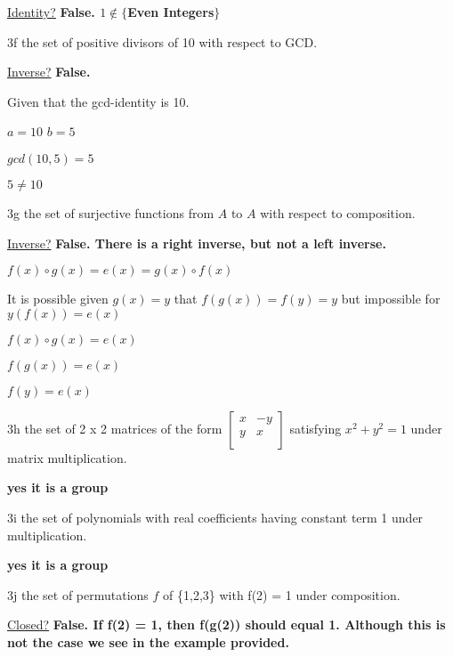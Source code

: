 \underline{Identity?} \textbf{False. $1 \notin \{$Even Integers$\}$}

\begin{question}{3f}
the set of positive divisors of 10 with respect to GCD.
\end{question}

\underline{Inverse?} \textbf{False.}

Given that the gcd-identity is 10.

$a=10$ $b=5$

$gcd(10,5) = 5$ 

$5 \neq 10$

\begin{question}{3g}
the set of surjective functions from $A$ to $A$ with respect to composition.
\end{question}

\underline{Inverse?} \textbf{False. There is a right inverse, but not a left inverse.}

$f(x) \circ g(x) = e(x) = g(x) \circ f(x)$

It is possible given $g(x) = y$ that $f(g(x)) = f(y) = y$ but impossible for $y(f(x)) = e(x)$

$f(x) \circ g(x) = e(x)$

$f(g(x)) = e(x)$

$f(y) = e(x)$

\begin{question}{3h}
the set of 2 x 2 matrices of the form $\begin{bmatrix}
  x & -y \\
  y & x  \\
 \end{bmatrix}$ satisfying $x^2 + y^2 = 1$ under matrix multiplication.

\end{question}

\textbf{yes it is a group}

\begin{question}{3i}
the set of polynomials with real coefficients having constant term 1 under multiplication.
\end{question}

\textbf{yes it is a group}

\begin{question}{3j}
the set of permutations $f$ of \{1,2,3\} with f(2) = 1 under composition.
\end{question}

\underline{Closed?} \textbf{False. If f(2) = 1, then f(g(2)) should equal 1. Although this is not the case we see in the example provided. }

